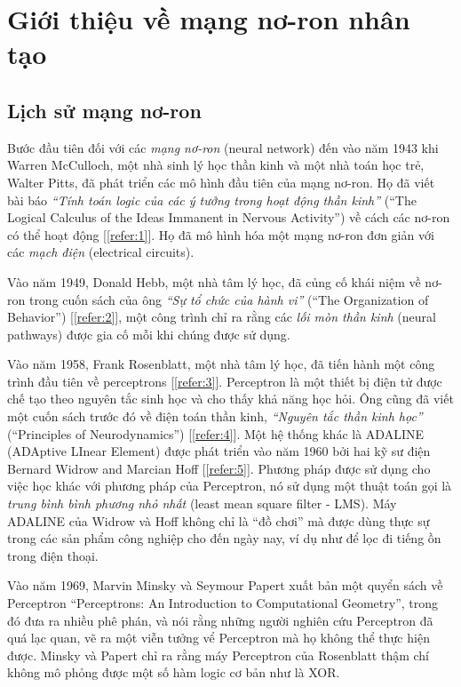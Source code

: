 \chapter{Giới thiệu về mạng nơ-ron nhân tạo}
\label{chp:01}

\section{Lịch sử mạng nơ-ron}
\label{sec:history}
Bước đầu tiên đối với các \textit{mạng nơ-ron} (neural network) đến vào năm 1943 khi Warren McCulloch, một nhà sinh lý học thần kinh và một nhà toán học trẻ, Walter Pitts, đã phát triển các mô hình đầu tiên của mạng nơ-ron. Họ đã viết bài báo \textit{``Tính toán logic của các ý tưởng trong hoạt động thần kinh''} (``The Logical Calculus of the Ideas Immanent in Nervous Activity'') về cách các nơ-ron có thể hoạt động [\ref{refer:1}]. Họ đã mô hình hóa một mạng nơ-ron đơn giản với các \textit{mạch điện} (electrical circuits).

Vào năm 1949, Donald Hebb, một nhà tâm lý học, đã củng cố khái niệm về nơ-ron trong cuốn sách của ông \textit{``Sự tổ chức của hành vi''} (``The Organization of Behavior'') [\ref{refer:2}], một công trình chỉ ra rằng các \textit{lối mòn thần kinh} (neural pathways) được gia cố mỗi khi chúng được sử dụng.

Vào năm 1958, Frank Rosenblatt, một nhà tâm lý học, đã tiến hành một công trình đầu tiên về perceptrons [\ref{refer:3}]. Perceptron là một thiết bị điện tử được chế tạo theo nguyên tắc sinh học và cho thấy khả năng học hỏi. Ông cũng đã viết một cuốn sách trước đó về điện toán thần kinh, \textit{``Nguyên tắc thần kinh học''} (``Principles of Neurodynamics'') [\ref{refer:4}].
Một hệ thống khác là ADALINE (ADAptive LInear Element) được phát triển vào năm 1960 bởi hai kỹ sư điện Bernard Widrow and Marcian Hoff [\ref{refer:5}]. Phương pháp được sử dụng cho việc học khác với phương pháp của Perceptron, nó sử dụng một thuật toán gọi là \textit{trung bình bình phương nhỏ nhất} (least mean square filter - LMS). Máy ADALINE của Widrow và Hoff không chỉ là ``đồ chơi'' mà được dùng thực sự trong các sản phẩm công nghiệp cho đến ngày nay, ví dụ như để lọc đi tiếng ồn trong điện thoại.

Vào năm 1969, Marvin Minsky và Seymour Papert xuất bản một quyển sách về Perceptron ``Perceptrons: An Introduction to Computational Geometry'', trong đó đưa ra nhiều phê phán, và nói rằng những người nghiên cứu Perceptron đã quá lạc quan, vẽ ra một viễn tưởng vể Perceptron mà họ không thể thực hiện được. Minsky và Papert chỉ ra rằng máy Perceptron của Rosenblatt thậm chí không mô phỏng được một số hàm logic cơ bản như là XOR.

